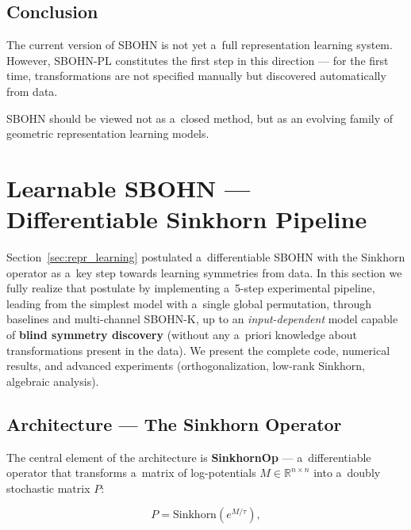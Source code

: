 \documentclass[11pt,a4paper]{report}
\begin{document}
\subsection{Conclusion}

The current version of SBOHN is not yet a~full representation learning system. However, SBOHN-PL constitutes the first step in this direction --- for the first time, transformations are not specified manually but discovered automatically from data.

SBOHN should be viewed not as a~closed method, but as an evolving family of geometric representation learning models.





\section{Learnable SBOHN --- Differentiable Sinkhorn Pipeline}\label{sec:learnable_sbohn}

Section~\ref{sec:repr_learning} postulated a~differentiable SBOHN with the Sinkhorn operator as a~key step towards learning symmetries from data.
In this section we fully realize that postulate by implementing a~5-step experimental pipeline,
leading from the simplest model with a~single global permutation, through baselines and multi-channel SBOHN-K,
up to an \emph{input-dependent} model capable of \textbf{blind symmetry discovery} (without any a~priori knowledge about transformations present in the data).
We present the complete code, numerical results, and advanced experiments (orthogonalization, low-rank Sinkhorn, algebraic analysis).

\subsection{Architecture --- The Sinkhorn Operator}

The central element of the architecture is \textbf{SinkhornOp} --- a~differentiable operator that transforms a~matrix of log-potentials $M \in \mathbb{R}^{n \times n}$ into a~doubly stochastic matrix $P$:

\begin{equation}
P = \text{Sinkhorn}\!\left(e^{M/\tau}\right),
\end{equation}
\end{document}

